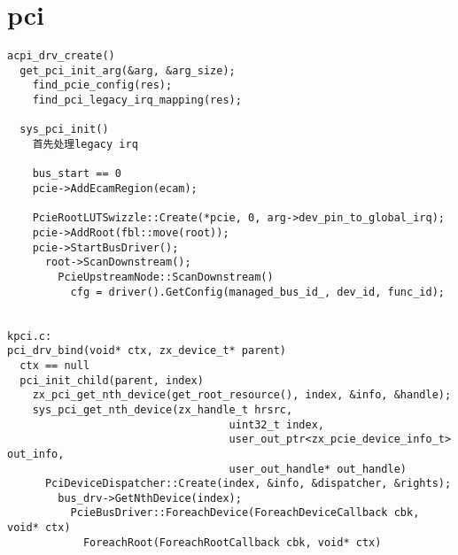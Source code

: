\section{pci}

\begin{verbatim}
acpi_drv_create()
  get_pci_init_arg(&arg, &arg_size);
    find_pcie_config(res);
    find_pci_legacy_irq_mapping(res);

  sys_pci_init()
    首先处理legacy irq

    bus_start == 0
    pcie->AddEcamRegion(ecam);

    PcieRootLUTSwizzle::Create(*pcie, 0, arg->dev_pin_to_global_irq);
    pcie->AddRoot(fbl::move(root));
    pcie->StartBusDriver();
      root->ScanDownstream();
        PcieUpstreamNode::ScanDownstream()
          cfg = driver().GetConfig(managed_bus_id_, dev_id, func_id);


kpci.c:
pci_drv_bind(void* ctx, zx_device_t* parent)
  ctx == null
  pci_init_child(parent, index)
    zx_pci_get_nth_device(get_root_resource(), index, &info, &handle);
    sys_pci_get_nth_device(zx_handle_t hrsrc,
                                   uint32_t index,
                                   user_out_ptr<zx_pcie_device_info_t> out_info,
                                   user_out_handle* out_handle)
      PciDeviceDispatcher::Create(index, &info, &dispatcher, &rights);
        bus_drv->GetNthDevice(index);
          PcieBusDriver::ForeachDevice(ForeachDeviceCallback cbk, void* ctx)
            ForeachRoot(ForeachRootCallback cbk, void* ctx)


\end{verbatim}